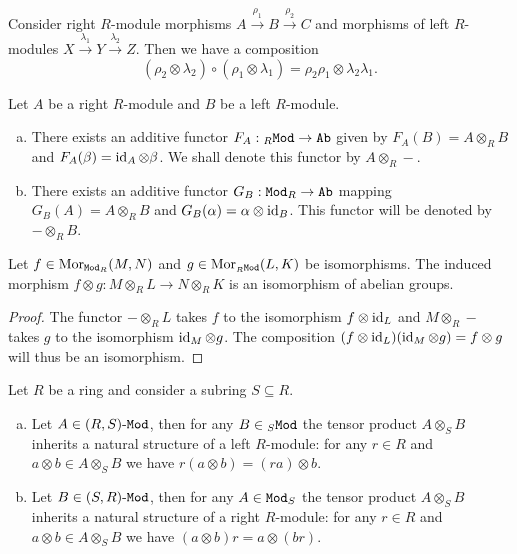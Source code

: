 \begin{corollary}
\label{cor:composition-tensored-maps}
Consider right \(R\)-module morphisms \(A \xrightarrow{\rho_1} B
\xrightarrow{\rho_2} C\) and morphisms of left \(R\)-modules \(X
\xrightarrow{\lambda_1} Y \xrightarrow{\lambda_2} Z\). Then we have a composition
\[
(\rho_2 \otimes \lambda_2) \circ (\rho_1 \otimes \lambda_1)
= \rho_2 \rho_1 \otimes \lambda_2 \lambda_1.
\]
\end{corollary}

\begin{lemma}
\label{lem:addive-tensor-functors}
Let \(A\) be a right \(R\)-module and \(B\) be a left \(R\)-module.
\begin{enumerate}[(a)]\setlength\itemsep{0em}
\item There exists an additive functor \(F_A: {{}_{R}\texttt{Mod}} \to {\texttt{Ab}}\) given by
  \(F_A(B) = A \otimes_R B\) and \(F_A(\beta) = \operatorname{id}_A \otimes \beta\). We shall
  denote this functor by \(A \otimes_R -\).

\item There exists an additive functor \(G_B: {\texttt{Mod}_{R}} \to {\texttt{Ab}}\) mapping \(G_B(A) =
  A \otimes_R B\) and \(G_B(\alpha) = \alpha \otimes \operatorname{id}_B\). This functor will
  be denoted by \(- \otimes_R B\).
\end{enumerate}
\end{lemma}

\begin{corollary}
\label{cor:isos-induce-iso-tensor}
Let \(f \in \operatorname{Mor}_{{\texttt{Mod}_{R}}}(M, N)\) and \(g \in \operatorname{Mor}_{{{}_{R}\texttt{Mod}}}(L, K)\) be
isomorphisms. The induced morphism
\(f \otimes g: M \otimes_R L \to N \otimes_R K\) is an isomorphism of abelian
groups.
\end{corollary}

\begin{proof}
The functor \(- \otimes_R L\) takes \(f\) to the isomorphism \(f \otimes \operatorname{id}_L\)
and \(M \otimes_R -\) takes \(g\) to the isomorphism \(\operatorname{id}_M \otimes g\). The
composition \((f \otimes \operatorname{id}_L) (\operatorname{id}_M \otimes g) = f \otimes g\) will thus be
an isomorphism.
\end{proof}

\begin{proposition}
\label{prop:extending-scalars-tensor-prod}
Let \(R\) be a ring and consider a subring \(S \subseteq R\).
\begin{enumerate}[(a)]\setlength\itemsep{0em}
\item Let \(A \in {(R, S)\text{-}\texttt{Mod}}\), then for any \(B \in {{}_{S}\texttt{Mod}}\) the tensor
  product \(A \otimes_S B\) inherits a natural structure of a left \(R\)-module:
  for any \(r \in R\) and \(a \otimes b \in A \otimes_S B\) we have
  \(r(a \otimes b) = (r a) \otimes b\).

\item Let \(B \in {(S, R)\text{-}\texttt{Mod}}\), then for any \(A \in {\texttt{Mod}_{S}}\) the tensor
  product \(A \otimes_S B\) inherits a natural structure of a right \(R\)-module:
  for any \(r \in R\) and \(a \otimes b \in A \otimes_S B\) we have
  \((a \otimes b) r = a \otimes (b r)\).
\end{enumerate}
\end{proposition}


